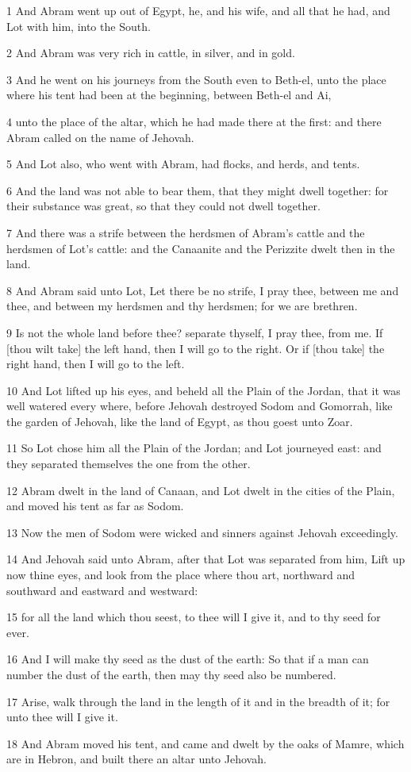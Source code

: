 \par 1 And Abram went up out of Egypt, he, and his wife, and all that he had, and Lot with him, into the South.
\par 2 And Abram was very rich in cattle, in silver, and in gold.
\par 3 And he went on his journeys from the South even to Beth-el, unto the place where his tent had been at the beginning, between Beth-el and Ai,
\par 4 unto the place of the altar, which he had made there at the first: and there Abram called on the name of Jehovah.
\par 5 And Lot also, who went with Abram, had flocks, and herds, and tents.
\par 6 And the land was not able to bear them, that they might dwell together: for their substance was great, so that they could not dwell together.
\par 7 And there was a strife between the herdsmen of Abram's cattle and the herdsmen of Lot's cattle: and the Canaanite and the Perizzite dwelt then in the land.
\par 8 And Abram said unto Lot, Let there be no strife, I pray thee, between me and thee, and between my herdsmen and thy herdsmen; for we are brethren.
\par 9 Is not the whole land before thee? separate thyself, I pray thee, from me. If [thou wilt take] the left hand, then I will go to the right. Or if [thou take] the right hand, then I will go to the left.
\par 10 And Lot lifted up his eyes, and beheld all the Plain of the Jordan, that it was well watered every where, before Jehovah destroyed Sodom and Gomorrah, like the garden of Jehovah, like the land of Egypt, as thou goest unto Zoar.
\par 11 So Lot chose him all the Plain of the Jordan; and Lot journeyed east: and they separated themselves the one from the other.
\par 12 Abram dwelt in the land of Canaan, and Lot dwelt in the cities of the Plain, and moved his tent as far as Sodom.
\par 13 Now the men of Sodom were wicked and sinners against Jehovah exceedingly.
\par 14 And Jehovah said unto Abram, after that Lot was separated from him, Lift up now thine eyes, and look from the place where thou art, northward and southward and eastward and westward:
\par 15 for all the land which thou seest, to thee will I give it, and to thy seed for ever.
\par 16 And I will make thy seed as the dust of the earth: So that if a man can number the dust of the earth, then may thy seed also be numbered.
\par 17 Arise, walk through the land in the length of it and in the breadth of it; for unto thee will I give it.
\par 18 And Abram moved his tent, and came and dwelt by the oaks of Mamre, which are in Hebron, and built there an altar unto Jehovah.

